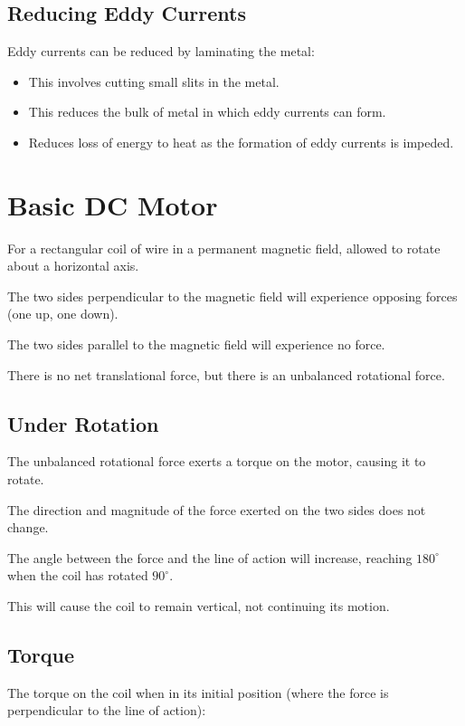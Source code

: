 \documentclass[a4paper,11pt]{article}
\begin{document}
\subsection{Reducing Eddy Currents}

Eddy currents can be reduced by laminating the metal:

\begin{itemize}
\item This involves cutting small slits in the metal.
\item This reduces the bulk of metal in which eddy currents can form.
\item Reduces loss of energy to heat as the formation of eddy currents is
	impeded.
\end{itemize}




\section{Basic DC Motor}

For a rectangular coil of wire in a permanent magnetic field, allowed to rotate
about a horizontal axis.

The two sides perpendicular to the magnetic field will experience opposing
forces (one up, one down).

The two sides parallel to the magnetic field will experience no force.

There is no net translational force, but there is an unbalanced rotational
force.


\subsection{Under Rotation}

The unbalanced rotational force exerts a torque on the motor, causing it to
rotate.

The direction and magnitude of the force exerted on the two sides does not
change.

The angle between the force and the line of action will increase, reaching
$180^\circ$ when the coil has rotated $90^\circ$.

This will cause the coil to remain vertical, not continuing its motion.


\subsection{Torque}

The torque on the coil when in its initial position (where the force is
perpendicular to the line of action):
\end{document}
